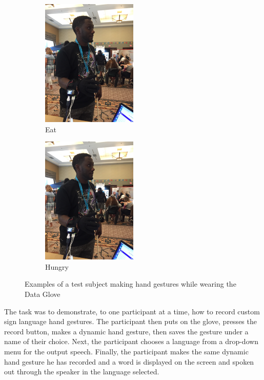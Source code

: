 \begin{figure}
    \begin{subfigure}
        \centering
        \includegraphics[width=0.5\textwidth]{./assets/img/ParticipantA}
        \caption{Eat}
        \label{fig:participanta}
    \end{subfigure}
    \begin{subfigure}
        \centering
        \includegraphics[width=0.5\textwidth]{./assets/img/ParticipantA}
        \caption{Hungry}
        \label{fig:participantb}
    \end{subfigure}
    \caption{Examples of a test subject making hand gestures while wearing the Data Glove}
    \label{fig:participants}
\end{figure}

The task was to demonstrate, to one participant at a time, how to record custom sign language hand gestures. The participant then puts on the glove, presses the record button, makes a dynamic hand gesture, then saves the gesture under a name of their choice. Next, the participant chooses a language from a drop-down menu for the output speech. Finally, the participant makes the same dynamic hand gesture he has recorded and a word is displayed on the screen and spoken out through the speaker in the language selected. 

